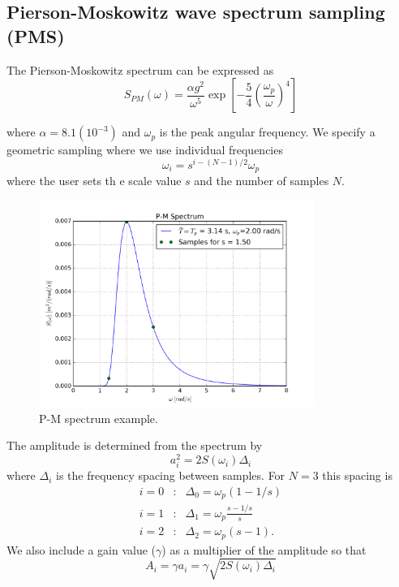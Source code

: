 \documentclass[11pt]{article}
\begin{document}
\subsection{Pierson-Moskowitz wave spectrum sampling (PMS)}

The Pierson-Moskowitz spectrum can be expressed as
\begin{equation}
S_{PM}(\omega)=\frac{\alpha g^2}{\omega^5} \exp{\left[ -\frac{5}{4} \left(\frac{\omega_p}{\omega}\right)^4 \right]}
\end{equation}

where $\alpha=8.1(10^{-3})$ and $\omega_p$ is the peak angular frequency.  We specify a geometric sampling where we use individual frequencies
\begin{equation}
  \omega_i = s^{i-(N-1)/2}\omega_p
\end{equation}
where the user sets th e scale value $s$ and the number of samples $N$.

\begin{figure}[hbt!]
\centerline{
{\includegraphics[width=0.8\textwidth]{pm_ex.png}}}
\caption{P-M spectrum example.}
\label{f:pm}
\end{figure}

The amplitude is determined from the spectrum by
\[
a_i^2 = 2 S(\omega_i) \Delta_i
\]
where $\Delta_i$ is the frequency spacing between samples. For $N=3$ this spacing is
\begin{eqnarray}
  i=0 & : & \Delta_0 = \omega_p(1-1/s) \\
  i=1 & : & \Delta_1 = \omega_p \frac{ s - 1/s}{s} \\
  i=2 & : & \Delta_2 = \omega_p (s-1).
\end{eqnarray}
We also include a gain value ($\gamma$) as a multiplier of the amplitude so that
\[
A_i = \gamma a_i = \gamma \sqrt{ 2 S(\omega_i) \Delta_i}
\]
\end{document}
